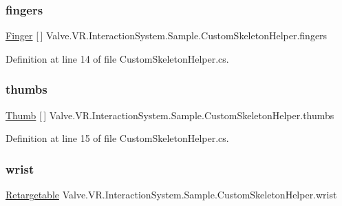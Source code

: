 \subsubsection{\texorpdfstring{fingers}{fingers}}
{\footnotesize\ttfamily \mbox{\hyperlink{class_valve_1_1_v_r_1_1_interaction_system_1_1_sample_1_1_custom_skeleton_helper_1_1_finger}{Finger}} \mbox{[}$\,$\mbox{]} Valve.\+V\+R.\+Interaction\+System.\+Sample.\+Custom\+Skeleton\+Helper.\+fingers}



Definition at line 14 of file Custom\+Skeleton\+Helper.\+cs.

\mbox{\label{class_valve_1_1_v_r_1_1_interaction_system_1_1_sample_1_1_custom_skeleton_helper_a8050efc95ae47ac8972d5b84168b7e5e}} 
\subsubsection{\texorpdfstring{thumbs}{thumbs}}
{\footnotesize\ttfamily \mbox{\hyperlink{class_valve_1_1_v_r_1_1_interaction_system_1_1_sample_1_1_custom_skeleton_helper_1_1_thumb}{Thumb}} \mbox{[}$\,$\mbox{]} Valve.\+V\+R.\+Interaction\+System.\+Sample.\+Custom\+Skeleton\+Helper.\+thumbs}



Definition at line 15 of file Custom\+Skeleton\+Helper.\+cs.

\mbox{\label{class_valve_1_1_v_r_1_1_interaction_system_1_1_sample_1_1_custom_skeleton_helper_a80f1eaf8cda277ec8068e43ddc306916}} 
\subsubsection{\texorpdfstring{wrist}{wrist}}
{\footnotesize\ttfamily \mbox{\hyperlink{class_valve_1_1_v_r_1_1_interaction_system_1_1_sample_1_1_custom_skeleton_helper_1_1_retargetable}{Retargetable}} Valve.\+V\+R.\+Interaction\+System.\+Sample.\+Custom\+Skeleton\+Helper.\+wrist}



